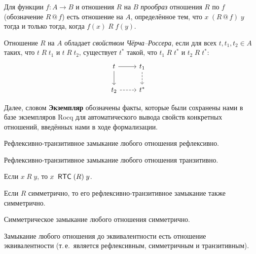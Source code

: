 \begin{definition}
Для функции $f : A \to B$ и отношения $R$ на $B$ \emph{прообраз}
отношения $R$ по $f$ (обозначение $R \mathbin{@} f$) есть отношение на $A$,
определённое тем, что
$x\;(R \mathbin{@} f)\;y$ тогда и только тогда, когда $f(x)\;R\;f(y)$.
\end{definition}

\begin{definition}
Отношение $R$ на $A$ обладает
\emph{свойством Чёрча--Россера}, если для всех
$t, t_1, t_2 \in A$ таких, что $t\;R\;t_1$ и
$t\;R\;t_2$, существует $t^*$ такой, что $t_1\;R\;t^*$
и $t_2\;R\;t^*$:
\[\begin{tikzcd}
    t \arrow[r] \arrow[d]
    & t_1 \arrow[d, dashed] \\
    t_2 \arrow[r, dashed] & t^*
\end{tikzcd}\]
\end{definition}

Далее, словом \textbf{Экземпляр} обозначены факты,
которые были сохранены нами в базе экземпляров Rocq для
автоматического вывода свойств конкретных отношений,
введённых нами в ходе формализации.

\begin{instance}
Рефлексивно-транзитивное замыкание любого отношения
рефлексивно.
\end{instance}

\begin{instance}
Рефлексивно-транзитивное замыкание любого отношения
транзитивно.
\end{instance}

\begin{lemma}
    Если $x\;R\;y$, то $x\;\mathrel{\mathsf{RTC}}(R)\;y$.
\end{lemma}

\begin{instance}
Если $R$ симметрично, то его рефлексивно-транзитивное
замыкание также симметрично.
\end{instance}

\begin{instance}
Симметрическое замыкание любого отношения симметрично.
\end{instance}

\begin{instance}
Замыкание любого отношения до эквивалентности есть
отношение эквивалентности
(т.\,е.~является рефлексивным, симметричным и
транзитивным).
\end{instance}

